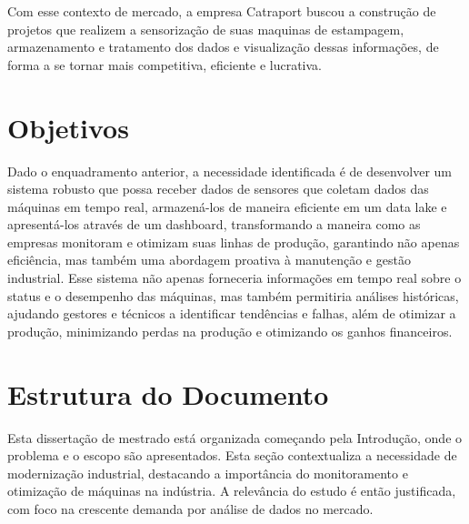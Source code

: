 Com esse contexto de mercado, a empresa Catraport buscou a construção de projetos que realizem a sensorização de suas maquinas de estampagem, armazenamento e tratamento dos dados e visualização dessas informações, de forma a se tornar mais competitiva, eficiente e lucrativa.

\section{Objetivos}




Dado o enquadramento anterior, a necessidade identificada é de desenvolver um sistema robusto que possa receber dados de sensores que coletam dados das máquinas em tempo real, armazená-los de maneira eficiente em um data lake e apresentá-los através de um dashboard, transformando a maneira como as empresas monitoram e otimizam suas linhas de produção, garantindo não apenas eficiência, mas também uma abordagem proativa à manutenção e gestão industrial. Esse sistema não apenas forneceria informações em tempo real sobre o status e o desempenho das máquinas, mas também permitiria análises históricas, ajudando gestores e técnicos a identificar tendências e falhas, além de otimizar a produção, minimizando perdas na produção e otimizando os ganhos financeiros.

\section{Estrutura do Documento}
Esta dissertação de mestrado está organizada começando pela Introdução, onde o problema e o escopo são apresentados. Esta seção contextualiza a necessidade de modernização industrial, destacando a importância do monitoramento e otimização de máquinas na indústria. A relevância do estudo é então justificada, com foco na crescente demanda por análise de dados no mercado.

